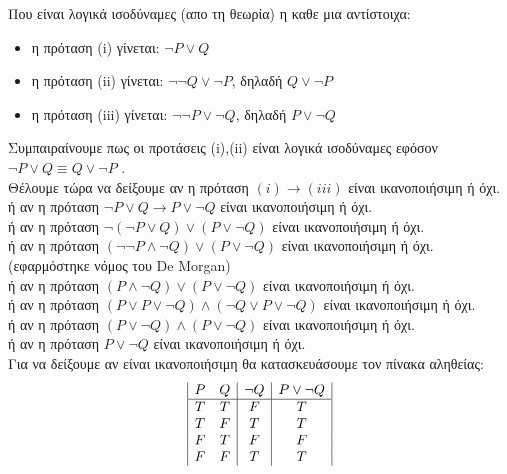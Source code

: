 \documentclass[12pt]{article}
\begin{document}
	
	\noindent
	Που είναι λογικά ισοδύναμες (απο τη θεωρία) η καθε μια αντίστοιχα:
	\begin{itemize}
		\item η  πρόταση \textlatin{(i)} γίνεται: $\neg P \lor Q$
		\item η  πρόταση \textlatin{(ii)} γίνεται: $\neg \neg Q \lor \neg P$, δηλαδή $Q \lor \neg P$
		\item η  πρόταση \textlatin{(iii)} γίνεται: $\neg \neg P \lor \neg Q$, δηλαδή  $P \lor \neg Q$
	\end{itemize}
	
	
	\noindent
	Συμπαιραίνουμε πως οι προτάσεις \textlatin{(i),(ii)} είναι λογικά ισοδύναμες εφόσον  $\neg P \lor Q \equiv Q \lor \neg P$ .\\
	
	\noindent
	Θέλουμε τώρα να δείξουμε αν η πρόταση $(i) \rightarrow (iii)$ είναι ικανοποιήσιμη ή όχι.\\
	ή αν η πρόταση  $\neg P \lor Q \rightarrow P \lor \neg Q$ είναι ικανοποιήσιμη ή όχι.\\
	ή αν η πρόταση  $\neg (\neg P \lor Q) \lor (P \lor \neg Q)$ είναι ικανοποιήσιμη ή όχι.\\
	ή αν η πρόταση  $(\neg \neg P \wedge \neg Q) \lor (P \lor \neg Q)$ είναι ικανοποιήσιμη ή όχι.(εφαρμόστηκε νόμος του \textlatin{De Morgan})\\
	ή αν η πρόταση  $(P \wedge \neg Q) \lor (P \lor \neg Q)$ είναι ικανοποιήσιμη ή όχι.\\
	ή αν η πρόταση  $(P  \lor P \lor \neg Q) \wedge (\neg Q \lor P \lor \neg Q)$ είναι ικανοποιήσιμη ή όχι.\\
	ή αν η πρόταση  $(P  \lor \neg Q) \wedge ( P \lor \neg Q)$ είναι ικανοποιήσιμη ή όχι.\\
	ή αν η πρόταση  $ P \lor \neg Q$ είναι ικανοποιήσιμη ή όχι.\\
	
	
	\noindent
	Για να δείξουμε αν είναι ικανοποιήσιμη θα κατασκευάσουμε τον πίνακα αληθείας:	
	\begin{displaymath}
	\begin{array}{|c c|c|c|}
	P & Q & \neg Q & P \lor \neg Q\\ %
	\hline %
	T & T & F & T\\
	T & F & T & T\\
	F & T & F & F\\
	F & F & T & T\\
	\end{array}
	\end{displaymath}
	
\end{document}
